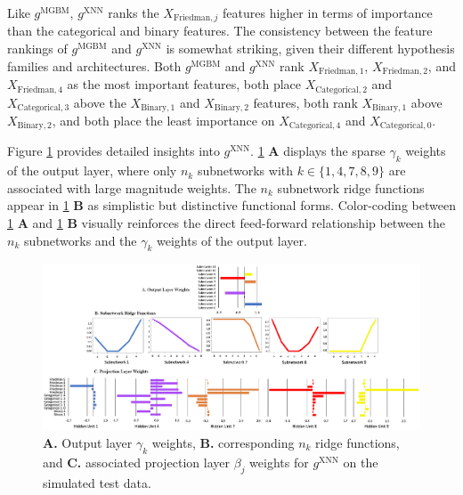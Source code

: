 \documentclass[information,article,submit,moreauthors,pdftex]{definitions/mdpi}
\begin{document}
\noindent Like $g^\text{MGBM}$, $g^\text{XNN}$ ranks the $X_{\text{Friedman},j}$ features higher in terms of importance than the categorical and binary features. The consistency between the feature rankings of $g^\text{MGBM}$ and $g^\text{XNN}$ is somewhat striking, given their different hypothesis families and architectures. Both $g^\text{MGBM}$ and $g^\text{XNN}$ rank $X_{\text{Friedman},1}$, $X_{\text{Friedman},2}$, and $X_{\text{Friedman},4}$ as the most important features, both place $X_{\text{Categorical},2}$ and $X_{\text{Categorical},3}$ above the $X_{\text{Binary},1}$ and $X_{\text{Binary},2}$ features, both rank $X_{\text{Binary},1}$ above $X_{\text{Binary},2}$, and both place the least importance on $X_{\text{Categorical},4}$ and $X_{\text{Categorical},0}$. 

Figure \ref{fig:sim_xnn_glob_ridge} provides detailed insights into $g^\text{XNN}$. \ref{fig:sim_xnn_glob_ridge} \textbf{A} displays the sparse $\gamma_k$ weights of the output layer, where only $n_k$ subnetworks with $k \in \{1, 4, 7, 8, 9\}$ are associated with large magnitude weights. The $n_k$ subnetwork ridge functions appear in \ref{fig:sim_xnn_glob_ridge} \textbf{B} as simplistic but distinctive functional forms. Color-coding between \ref{fig:sim_xnn_glob_ridge} \textbf{A} and \ref{fig:sim_xnn_glob_ridge} \textbf{B} visually reinforces the direct feed-forward relationship between the $n_k$ subnetworks and the $\gamma_k$ weights of the output layer.

\begin{figure}[H]
	\centering
	\includegraphics[width=17cm]{img/sim_xnn_glob_ridge.png}
	\caption{\textbf{A.} Output layer $\gamma_k$ weights, \textbf{B.} corresponding $n_k$ ridge functions, and \textbf{C.} associated projection layer $\beta_j$ weights for $g^\text{XNN}$ on the simulated test data.}
	\label{fig:sim_xnn_glob_ridge}
\end{figure}   
\end{document}
